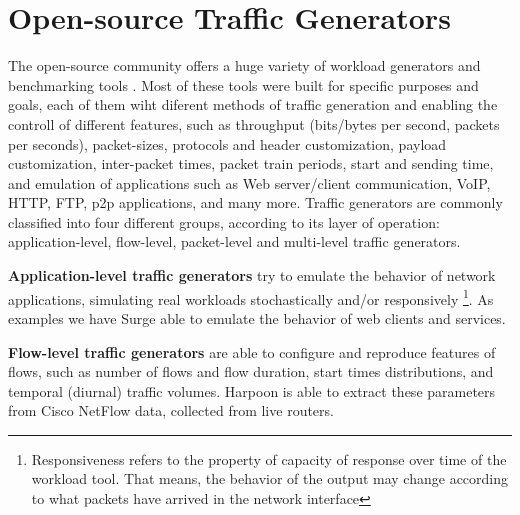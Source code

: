 \section{Open-source Traffic Generators}\label{sec:review}

The open-source community offers a huge variety of workload generators and benchmarking tools \cite{ditg-paper}\cite{validate-trafficgen}\cite{comparative-trafficgen-tools}\cite{performance-trafficgen}. Most of these tools were built for specific purposes and goals, each of them wiht diferent methods of traffic generation and enabling the controll of  different features, such as throughput (bits/bytes per second, packets per seconds), packet-sizes, protocols and header customization, payload customization, inter-packet times, packet train periods, start and sending time, and emulation of applications such as Web server/client communication, VoIP, HTTP, FTP, p2p applications, and many more. Traffic generators are commonly classified into four different groups, according to its layer of operation\cite{do-you-trust}: application-level, flow-level, packet-level and multi-level traffic generators. 

\textbf{Application-level traffic generators} try to emulate the behavior of network applications, simulating real workloads stochastically and/or responsively \footnote{Responsiveness refers to the property of capacity of response over time of the workload tool. That means, the behavior of the output may change according to what packets have arrived in the network interface}. As examples we have Surge\cite{surge-paper} able to emulate the behavior of web clients and services. 


\textbf{Flow-level traffic generators} are able to configure and reproduce features of flows\cite{do-you-trust}\cite{sourcesonoff-paper}, such as number of flows and flow duration, start times distributions, and temporal (diurnal) traffic volumes\cite{do-you-trust}. Harpoon \cite{harpoon-paper} is able to extract these parameters from Cisco NetFlow data, collected from live routers.

